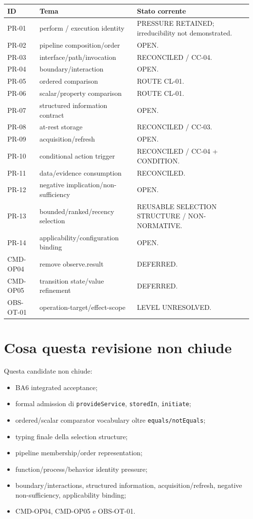 \documentclass[11pt,a4paper]{article}
\begin{document}
\begin{longtable}{L{25mm}L{55mm}L{58mm}}
\toprule
\textbf{ID} & \textbf{Tema} & \textbf{Stato corrente} \\
\midrule\endhead
PR-01 & perform / execution identity & PRESSURE RETAINED; irreducibility not demonstrated. \\
PR-02 & pipeline composition/order & OPEN. \\
PR-03 & interface/path/invocation & RECONCILED / CC-04. \\
PR-04 & boundary/interaction & OPEN. \\
PR-05 & ordered comparison & ROUTE CL-01. \\
PR-06 & scalar/property comparison & ROUTE CL-01. \\
PR-07 & structured information contract & OPEN. \\
PR-08 & at-rest storage & RECONCILED / CC-03. \\
PR-09 & acquisition/refresh & OPEN. \\
PR-10 & conditional action trigger & RECONCILED / CC-04 + CONDITION. \\
PR-11 & data/evidence consumption & RECONCILED. \\
PR-12 & negative implication/non-sufficiency & OPEN. \\
PR-13 & bounded/ranked/recency selection & REUSABLE SELECTION STRUCTURE / NON-NORMATIVE. \\
PR-14 & applicability/configuration binding & OPEN. \\
CMD-OP04 & remove observe.result & DEFERRED. \\
CMD-OP05 & transition state/value refinement & DEFERRED. \\
OBS-OT-01 & operation-target/effect-scope & LEVEL UNRESOLVED. \\
\bottomrule
\end{longtable}

\section{Cosa questa revisione non chiude}

Questa candidate non chiude:
\begin{itemize}
  \item BA6 integrated acceptance;
  \item formal admission di \texttt{provideService}, \texttt{storedIn}, \texttt{initiate};
  \item ordered/scalar comparator vocabulary oltre \texttt{equals/notEquals};
  \item typing finale della selection structure;
  \item pipeline membership/order representation;
  \item function/process/behavior identity pressure;
  \item boundary/interactions, structured information, acquisition/refresh, negative non-sufficiency, applicability binding;
  \item CMD-OP04, CMD-OP05 e OBS-OT-01.
\end{itemize}
\end{document}
